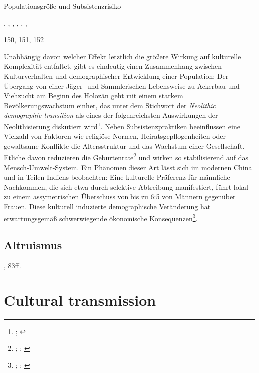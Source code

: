 \documentclass[openany,twoside,twocolumn]{book}
\let\rmarkdownfootnote\footnote%
\def\footnote{\protect\rmarkdownfootnote}
\begin{document}
Populationsgröße und Subsistenzrisiko

\textcite{henrich_demography_2004}, \textcite{collard_what_2011},
\textcite{KobayashiInnovativenesspopulationsize2012},
\textcite{collard_population_2013},
\textcite{BaldiniRevisitingEffectPopulation2015},
\textcite{henrich_understanding_2016}, \textcite{vaesen_population_2016}

150, 151, 152

Unabhängig davon welcher Effekt letztlich die größere Wirkung auf
kulturelle Komplexität entfaltet, gibt es eindeutig einen Zusammenhang
zwischen Kulturverhalten und demographischer Entwicklung einer
Population: Der Übergang von einer Jäger- und Sammlerischen Lebensweise
zu Ackerbau und Viehzucht am Beginn des Holozän geht mit einem starkem
Bevölkerungswachstum einher, das unter dem Stichwort der \emph{Neolithic
demographic transition} als eines der folgenreichsten Auswirkungen der
Neolithisierung diskutiert wird\footnote{\textcite{bocquetappel_paleoanthropological_2002};
  \textcite{gage_what_2009}}. Neben Subsistenzpraktiken beeinflussen
eine Vielzahl von Faktoren wie religiöse Normen, Heiratsgepflogenheiten
oder gewaltsame Konflikte die Altersstruktur und das Wachstum einer
Gesellschaft. Etliche davon reduzieren die Geburtenrate\footnote{\textcite{smith_cultural_1992};
  \textcite{colleran_cultural_2016}; \textcite{richerson_natural_1984}}
und wirken so stabilisierend auf das Mensch-Umwelt-System. Ein Phänomen
dieser Art lässt sich im modernen China und in Teilen Indiens
beobachten: Eine kulturelle Präferenz für männliche Nachkommen, die sich
etwa durch selektive Abtreibung manifestiert, führt lokal zu einem
assymetrischen Überschuss von bis zu 6:5 von Männern gegenüber Frauen.
Diese kulturell induzierte demographische Veränderung hat
erwartungsgemäß schwerwiegende ökonomische Konsequenzen\footnote{\textcite{banister_shortage_2004};
  \textcite{li_cultural_2000}; \textcite{tuljapurkar_high_1995}}.

\hypertarget{altruismus}{%
\subsection{Altruismus}\label{altruismus}}

\textcite{smith_cultural_1992}, 83ff.

\hypertarget{cultural-transmission}{%
\section{Cultural transmission}\label{cultural-transmission}}
\end{document}
